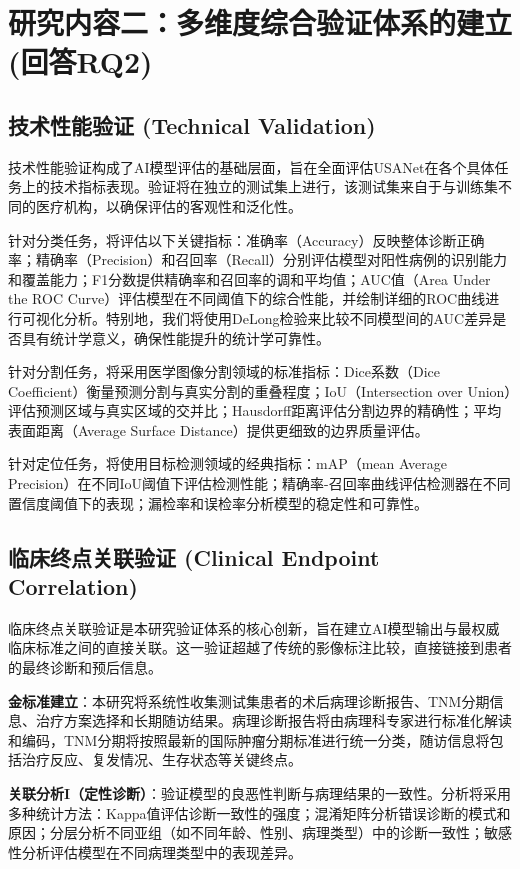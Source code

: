 \section{研究内容二：多维度综合验证体系的建立 (回答RQ2)}

\subsection{技术性能验证 (Technical Validation)}

技术性能验证构成了AI模型评估的基础层面，旨在全面评估USANet在各个具体任务上的技术指标表现。验证将在独立的测试集上进行，该测试集来自于与训练集不同的医疗机构，以确保评估的客观性和泛化性。

针对分类任务，将评估以下关键指标：准确率（Accuracy）反映整体诊断正确率；精确率（Precision）和召回率（Recall）分别评估模型对阳性病例的识别能力和覆盖能力；F1分数提供精确率和召回率的调和平均值；AUC值（Area Under the ROC Curve）评估模型在不同阈值下的综合性能，并绘制详细的ROC曲线进行可视化分析。特别地，我们将使用DeLong检验来比较不同模型间的AUC差异是否具有统计学意义，确保性能提升的统计学可靠性。

针对分割任务，将采用医学图像分割领域的标准指标：Dice系数（Dice Coefficient）衡量预测分割与真实分割的重叠程度；IoU（Intersection over Union）评估预测区域与真实区域的交并比；Hausdorff距离评估分割边界的精确性；平均表面距离（Average Surface Distance）提供更细致的边界质量评估。

针对定位任务，将使用目标检测领域的经典指标：mAP（mean Average Precision）在不同IoU阈值下评估检测性能；精确率-召回率曲线评估检测器在不同置信度阈值下的表现；漏检率和误检率分析模型的稳定性和可靠性。

\subsection{临床终点关联验证 (Clinical Endpoint Correlation)}

临床终点关联验证是本研究验证体系的核心创新，旨在建立AI模型输出与最权威临床标准之间的直接关联。这一验证超越了传统的影像标注比较，直接链接到患者的最终诊断和预后信息。

\textbf{金标准建立}：本研究将系统性收集测试集患者的术后病理诊断报告、TNM分期信息、治疗方案选择和长期随访结果。病理诊断报告将由病理科专家进行标准化解读和编码，TNM分期将按照最新的国际肿瘤分期标准进行统一分类，随访信息将包括治疗反应、复发情况、生存状态等关键终点。

\textbf{关联分析I（定性诊断）}：验证模型的良恶性判断与病理结果的一致性。分析将采用多种统计方法：Kappa值评估诊断一致性的强度；混淆矩阵分析错误诊断的模式和原因；分层分析不同亚组（如不同年龄、性别、病理类型）中的诊断一致性；敏感性分析评估模型在不同病理类型中的表现差异。


